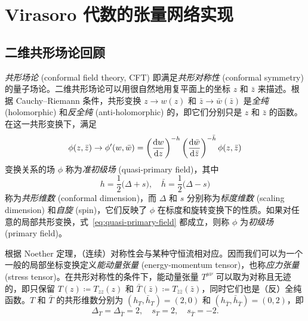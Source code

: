\chapter{Virasoro 代数的张量网络实现}

\section{二维共形场论回顾}

\emph{共形场论} (conformal field theory, CFT)\cite{ginsparg1988applied,francesco2012conformal} 即满足\emph{共形对称性} (conformal symmetry) 的量子场论。二维共形场论可以用很自然地用复平面上的坐标 $z$ 和 $\bar{z}$ 来描述。根据 Cauchy--Riemann 条件，共形变换 $z\to w(z)$ 和 $\bar{z}\to\bar{w}(\bar{z})$ 是\emph{全纯} (holomorphic) 和\emph{反全纯} (anti-holomorphic) 的，即它们分别只是 $z$ 和 $\bar{z}$ 的函数。在这一共形变换下，满足
\begin{equation}
  \phi(z,\bar{z}) \to \phi'(w,\bar{w}) =
  \left( \frac{\mathrm{d}w}{\mathrm{d}z} \right)^{-h} \left( \frac{\mathrm{d}\bar{w}}{\mathrm{d}\bar{z}} \right)^{-\bar{h}} \phi(z,\bar{z})
  \label{eq:quasi-primary-field}
\end{equation}
变换关系的场 $\phi$ 称为\emph{准初级场} (quasi-primary field)，其中
\begin{equation}
  h = \frac12 \bigl( \Delta+s \bigr), \quad \bar{h} = \frac12 \bigl( \Delta-s \bigr)
\end{equation}
称为\emph{共形维数} (conformal dimension)，而 $\Delta$ 和 $s$ 分别称为\emph{标度维数} (scaling dimension) 和\emph{自旋} (spin)，它们反映了 $\phi$ 在标度和旋转变换下的性质。如果对任意的局部共形变换，式~\eqref{eq:quasi-primary-field} 都成立，则称 $\phi$ 为\emph{初级场} (primary field)。

根据 Noether 定理，（连续）对称性会与某种守恒流相对应。因而我们可以为一个一般的局部坐标变换定义\emph{能动量张量} (energy-momentum tensor)，也称\emph{应力张量} (stress tensor)。在共形对称性的条件下，能动量张量 $T^{\mu\nu}$ 可以取为对称且无迹的，即只保留 $T(z)\coloneq T_{zz}(z)$ 和 $\bar{T}(\bar{z})\coloneq T_{\bar{z}\bar{z}}(\bar{z})$，同时它们也是（反）全纯函数\cite{ginsparg1988applied,cardy2010conformal,francesco2012conformal}。$T$ 和 $\bar{T}$ 的共形维数分别为 $(h_T,\bar{h}_T)=(2,0)$ 和 $(h_{\bar{T}},\bar{h}_{\bar{T}})=(0,2)$，即
\begin{equation}
  \Delta_T = \Delta_{\bar{T}} = 2, \quad s_T = 2, \quad s_{\bar{T}} = -2.
\end{equation}

